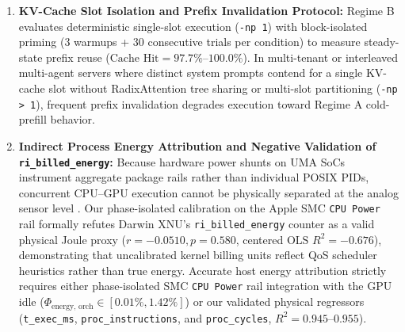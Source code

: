 \documentclass[preprint,12pt,3p]{elsarticle}
\begin{document}
\begin{enumerate}
    \item \textbf{KV-Cache Slot Isolation and Prefix Invalidation Protocol:} Regime B evaluates deterministic single-slot execution (\texttt{-np 1}) with block-isolated priming (3 warmups + 30 consecutive trials per condition) to measure steady-state prefix reuse ($\text{Cache Hit} = 97.7\%\text{--}100.0\%$). In multi-tenant or interleaved multi-agent servers where distinct system prompts contend for a single KV-cache slot without RadixAttention tree sharing \cite{kwon2023vllm} or multi-slot partitioning (\texttt{-np > 1}), frequent prefix invalidation degrades execution toward Regime A cold-prefill behavior.
    \item \textbf{Indirect Process Energy Attribution and Negative Validation of \texttt{ri\_billed\_energy}:} Because hardware power shunts on UMA SoCs instrument aggregate package rails rather than individual POSIX PIDs, concurrent CPU--GPU execution cannot be physically separated at the analog sensor level \cite{fahad2019comparative, you2023zeus}. Our phase-isolated calibration on the Apple SMC \texttt{CPU Power} rail formally refutes Darwin XNU's \texttt{ri\_billed\_energy} counter as a valid physical Joule proxy ($r = -0.0510, p = 0.580$, centered $\text{OLS } R^2 = -0.676$), demonstrating that uncalibrated kernel billing units reflect QoS scheduler heuristics rather than true energy. Accurate host energy attribution strictly requires either phase-isolated SMC \texttt{CPU Power} rail integration with the GPU idle ($\Phi_{\text{energy, orch}} \in [0.01\%, 1.42\%]$) or our validated physical regressors (\texttt{t\_exec\_ms}, \texttt{proc\_instructions}, and \texttt{proc\_cycles}, $R^2 = 0.945\text{--}0.955$).

\end{enumerate}
\end{document}
